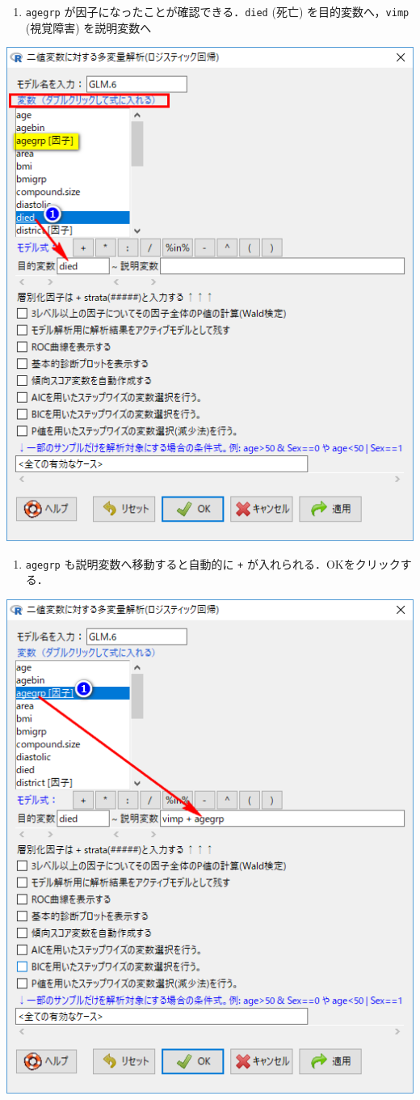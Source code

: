 \documentclass[11pt,]{problemset}
\providecommand{\tightlist}{%
  \setlength{\itemsep}{0pt}\setlength{\parskip}{0pt}}
\begin{document}
\newpage

\vfill

\begin{enumerate}
\def\labelenumi{\arabic{enumi}.}
\setcounter{enumi}{1}
\tightlist
\item
  \texttt{agegrp} が因子になったことが確認できる．\newline \texttt{died}
  (死亡) を目的変数へ，\texttt{vimp} (視覚障害) を説明変数へ
\end{enumerate}

\begin{center}\includegraphics[width=0.5\linewidth,height=0.5\textheight]{pic/mltlogstic05} \end{center}

\begin{enumerate}
\def\labelenumi{\arabic{enumi}.}
\setcounter{enumi}{2}
\tightlist
\item
  \texttt{agegrp} も説明変数へ移動すると自動的に \texttt{+}
  が入れられる．OKをクリックする．
\end{enumerate}

\begin{center}\includegraphics[width=0.5\linewidth,height=0.5\textheight]{pic/mltlogstic06} \end{center}
\end{document}
